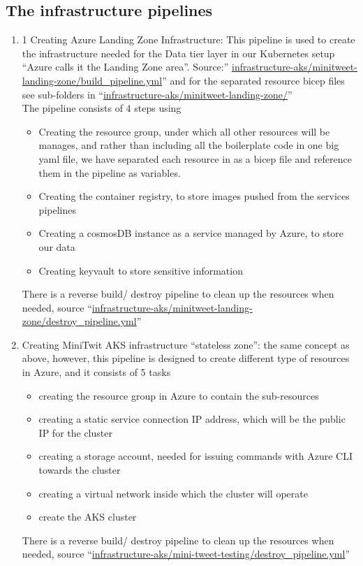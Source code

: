 \subsection{The infrastructure pipelines}\label{subsec:infraStructure}
\begin{enumerate}
    \item 1	Creating Azure Landing Zone Infrastructure: This pipeline is used to create the infrastructure needed for the Data tier layer in our Kubernetes setup “Azure calls it the Landing Zone area”. Source:” \url{infrastructure-aks/minitweet-landing-zone/build\_pipeline.yml}” and for the separated resource bicep files see sub-folders in “\url{infrastructure-aks/minitweet-landing-zone/}”\\
    The pipeline consists of 4 steps using
    \begin{itemize}
        \item Creating the resource group, under which all other resources will be manages, and rather than including all the boilerplate code in one big yaml file, we have separated each resource in as a bicep file and reference them in the pipeline as variables.
        \item Creating the container registry, to store images pushed from the services pipelines
        \item Creating a cosmosDB instance as a service managed by Azure, to store our data
        \item Creating keyvault to store sensitive information 
    \end{itemize}
    There is a reverse build/ destroy pipeline to clean up the resources when needed, source “\url{infrastructure-aks/minitweet-landing-zone/destroy\_pipeline.yml}”
    \item Creating MiniTwit AKS infrastructure “stateless zone”: the same concept as above, however, this pipeline is designed to create different type of resources in Azure, and it consists of 5 tasks
    \begin{itemize}
        \item creating the resource group in Azure to contain the sub-resources
        \item creating a static service connection IP address, which will be the public IP for the cluster
        \item creating a storage account, needed for issuing commands with Azure CLI towards the cluster
        \item creating a virtual network inside which the cluster will operate 
        \item create the AKS cluster
    \end{itemize}
    There is a reverse build/ destroy pipeline to clean up the resources when needed, source “\url{infrastructure-aks/mini-tweet-testing/destroy\_pipeline.yml}”
\end{enumerate}